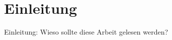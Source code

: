 \chapter{Einleitung}
\label{chap:Einleitung}
%
Einleitung: Wieso sollte diese Arbeit gelesen werden?
%